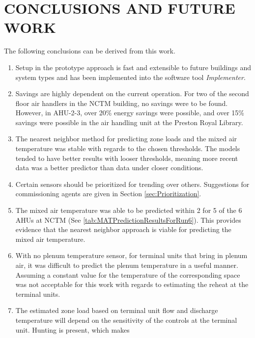 \chapter{\texorpdfstring{\MakeUppercase{Conclusions and Future Work}}{Conclusions and Future Work}}

The following conclusions can be derived from this work.

\begin{enumerate}
    \item Setup in the prototype approach is fast and extensible to
        future buildings and system types and has been implemented into
        the software tool \textit{Implementer}.
    \item Savings are highly dependent on the current operation. For two
        of the second floor air handlers in the NCTM building, no
        savings were to be found. However, in AHU-2-3, over 20\% energy
        savings were possible, and over 15\% savings were possible in
        the air handling unit at the Preston Royal Library. 
    \item The nearest neighbor method for predicting zone loads and the
        mixed air temperature was stable with regards to the chosen
        thresholds. The models tended to have better results with looser
        thresholds, meaning more recent data was a better predictor than
        data under closer conditions.
    \item Certain sensors should be prioritized for trending over
        others. Suggestions for commissioning agents are given in
        Section \ref{sec:Prioritization}.
    \item The mixed air temperature was able to be predicted within
        \SI{2}{\degF} for 5 of the 6 AHUs at NCTM (See \tableref{}
        \ref{tab:MATPredictionResultsForRun6}). This provides evidence
        that the nearest neighbor approach is viable for predicting the
        mixed air temperature.
    \item With no plenum temperature sensor, for terminal units that
        bring in plenum air, it was difficult to predict the plenum
        temperature in a useful manner. Assuming a constant value for the
        temperature of the corresponding space was not acceptable for
        this work with regards to estimating the reheat at the terminal units.
    \item The estimated zone load based on terminal unit flow and
        discharge temperature will depend on the sensitivity of the
        controls at the terminal unit. Hunting is present, which makes

\end{enumerate}
